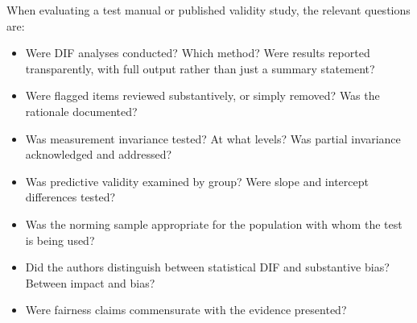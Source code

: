 \documentclass[
  11pt,
  letterpaper,
]{scrbook}
\providecommand{\tightlist}{%
  \setlength{\itemsep}{0pt}\setlength{\parskip}{0pt}}
\begin{document}
\begin{table}

\caption{\label{tbl-fairness-evidence}Sources of evidence in a fairness
argument. Each addresses a different aspect of measurement equivalence
and appropriate use.}


\end{table}%

When evaluating a test manual or published validity study, the relevant
questions are:

\begin{itemize}
\tightlist
\item
  Were DIF analyses conducted? Which method? Were results reported
  transparently, with full output rather than just a summary statement?
\item
  Were flagged items reviewed substantively, or simply removed? Was the
  rationale documented?
\item
  Was measurement invariance tested? At what levels? Was partial
  invariance acknowledged and addressed?
\item
  Was predictive validity examined by group? Were slope and intercept
  differences tested?
\item
  Was the norming sample appropriate for the population with whom the
  test is being used?
\item
  Did the authors distinguish between statistical DIF and substantive
  bias? Between impact and bias?
\item
  Were fairness claims commensurate with the evidence presented?
\end{itemize}
\end{document}
